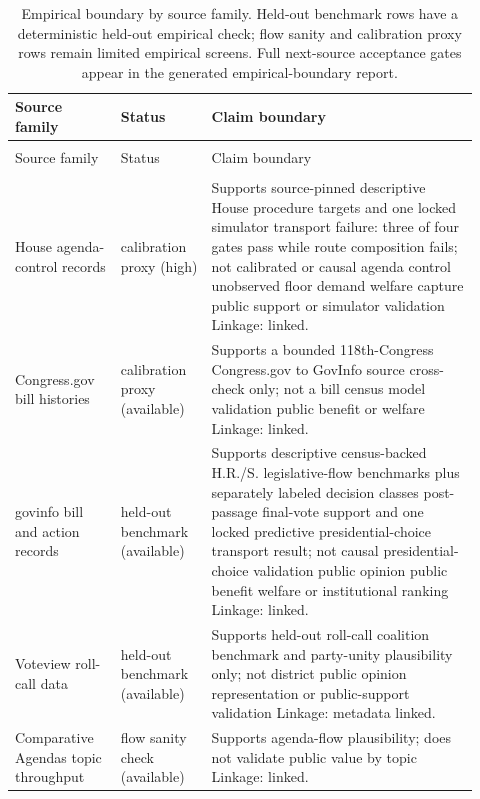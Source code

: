 \begingroup
\scriptsize
\setlength{\LTpre}{0pt}
\setlength{\LTpost}{0pt}
\begin{longtable}{>{\raggedright\arraybackslash}p{0.21\linewidth}>{\raggedright\arraybackslash}p{0.18\linewidth}>{\raggedright\arraybackslash}p{0.53\linewidth}}
\caption{Empirical boundary by source family. Held-out benchmark rows have a deterministic held-out empirical check; flow sanity and calibration proxy rows remain limited empirical screens. Full next-source acceptance gates appear in the generated empirical-boundary report.}
\label{tab:empirical-validation-gap} \\
\toprule
Source family & Status & Claim boundary \\
\midrule
\endfirsthead
\multicolumn{3}{l}{\small Empirical boundary by source family (continued)} \\
\toprule
Source family & Status & Claim boundary \\
\midrule
\endhead
\midrule
\multicolumn{3}{r}{\footnotesize Continued on next page} \\
\endfoot
\bottomrule
\endlastfoot
House agenda-control records & calibration proxy (high) & Supports source-pinned descriptive House procedure targets and one locked simulator transport failure: three of four gates pass while route composition fails; not calibrated or causal agenda control unobserved floor demand welfare capture public support or simulator validation Linkage: linked. \\
Congress.gov bill histories & calibration proxy (available) & Supports a bounded 118th-Congress Congress.gov to GovInfo source cross-check only; not a bill census model validation public benefit or welfare Linkage: linked. \\
govinfo bill and action records & held-out benchmark (available) & Supports descriptive census-backed H.R./S. legislative-flow benchmarks plus separately labeled decision classes post-passage final-vote support and one locked predictive presidential-choice transport result; not causal presidential-choice validation public opinion public benefit welfare or institutional ranking Linkage: linked. \\
Voteview roll-call data & held-out benchmark (available) & Supports held-out roll-call coalition benchmark and party-unity plausibility only; not district public opinion representation or public-support validation Linkage: metadata linked. \\
Comparative Agendas topic throughput & flow sanity check (available) & Supports agenda-flow plausibility; does not validate public value by topic Linkage: linked. \\

\end{longtable}
